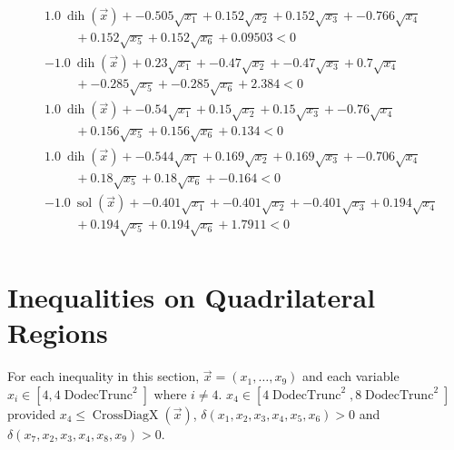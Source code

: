 \documentclass{article} %
\DeclareMathOperator{\sol}{sol}
\DeclareMathOperator{\dih}{dih}
\DeclareMathOperator{\trunc}{DodecTrunc}
\DeclareMathOperator{\diag}{CrossDiagX}
\newcommand{\vx}{\vec{x}}
\begin{document}
\begin{align*}
&1.0\ \dih(\vx) + -0.505\sqrt{x_1} +0.152\sqrt{x_2} +0.152\sqrt{x_3} +-0.766\sqrt{x_4} \\ &\hspace{1cm} +0.152\sqrt{x_5} +0.152\sqrt{x_6} +0.09503 < 0 \tag{D\_339650543} \\
&-1.0\ \dih(\vx) + 0.23\sqrt{x_1} +-0.47\sqrt{x_2} +-0.47\sqrt{x_3} +0.7\sqrt{x_4} \\ &\hspace{1cm} +-0.285\sqrt{x_5} +-0.285\sqrt{x_6} +2.384 < 0 \tag{D\_383109655} \\
&1.0\ \dih(\vx) + -0.54\sqrt{x_1} +0.15\sqrt{x_2} +0.15\sqrt{x_3} +-0.76\sqrt{x_4} \\ &\hspace{1cm} +0.156\sqrt{x_5} +0.156\sqrt{x_6} +0.134 < 0 \tag{D\_770579085} \\
&1.0\ \dih(\vx) + -0.544\sqrt{x_1} +0.169\sqrt{x_2} +0.169\sqrt{x_3} +-0.706\sqrt{x_4} \\ &\hspace{1cm} +0.18\sqrt{x_5} +0.18\sqrt{x_6} +-0.164 < 0 \tag{D\_137740353} \\
&-1.0\ \sol(\vx) + -0.401\sqrt{x_1} +-0.401\sqrt{x_2} +-0.401\sqrt{x_3} +0.194\sqrt{x_4} \\ &\hspace{1cm} +0.194\sqrt{x_5} +0.194\sqrt{x_6} +1.7911 < 0 \tag{D\_996324352} \\
\end{align*} 

\section*{Inequalities on Quadrilateral Regions}

For each inequality in this section, 
$\vx = (x_1,\ldots,x_9)$ and each variable $x_i\in[4,4\trunc^2]$ where $i\neq 4$.
$x_4\in[4\trunc^2,8\trunc^2]$ provided $x_4 \leq \diag(\vx)$,
$\delta(x_1,x_2,x_3,x_4,x_5,x_6) > 0$ and 
$\delta(x_7,x_2,x_3,x_4,x_8,x_9) > 0$.
\end{document}
